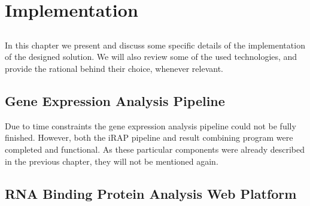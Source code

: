 \chapter{Implementation} \label{chap:implementation}

\section*{}

In this chapter we present and discuss some specific details of the
implementation of the designed solution. We will also review some of the used
technologies, and provide the rational behind their choice, whenever relevant.


\section{Gene Expression Analysis Pipeline}


Due to time constraints the gene expression analysis pipeline could not be fully
finished. However, both the iRAP pipeline and result combining program were
completed and functional. As these particular components were already described
in the previous chapter, they will not be mentioned again.

\section{RNA Binding Protein Analysis Web Platform}


